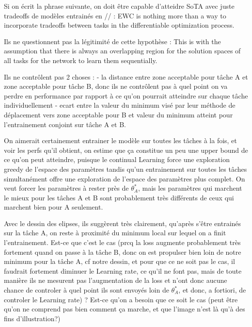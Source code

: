 \documentclass[twocolumn]{article}
\begin{document}
\vspace{1mm}
\noindent
Si on écrit la phrase suivante, on doit être capable d'atteidre SoTA avec juste tradeoffs de modèles entrainés en // : EWC is nothing more than a way to incorporate tradeoffs between tasks in the differentiable optimization process.

\vspace{1mm}
\noindent
Ils ne questionnent pas la légitimité de cette hypothèse :  This is with the assumption that there is always
an overlapping region for the solution spaces of all tasks for the network to learn them sequentially.

\vspace{1mm}
\noindent
Ils ne contrôlent pas 2 choses :
- la distance entre zone acceptable pour tâche A et zone acceptable pour tâche B, donc ils ne contrôlent pas à quel point on va perdre en performance par rapport à ce qu'on pourrait atteindre sur chaque tâche individuellement
- ecart entre la valeur du minimum visé par leur méthode de déplacement vers zone acceptable pour B et valeur du minimum atteint pour l'entrainement conjoint sur tâche A et B.

\vspace{1mm}
\noindent
On aimerait certainement entrainer le modèle sur toutes les tâches à la fois, et voir les perfs qu'il obtient, on estime que ça constitue un peu une upper bound de ce qu'on peut atteindre, puisque le continual Learning force une exploration greedy de l'espace des paramètres tandis qu'un entrainement sur toutes les tâches simultanément offre une exploration de l'espace des paramètres plus complet. On veut forcer les paramètres à rester près de $\theta_A^*$, mais les paramètres qui marchent le mieux pour les tâches A et B sont probablement très différents de ceux qui marchent bien pour A seulement.

\vspace{1mm}
\noindent
Avec le dessin des elipses, ils suggèrent très clairement, qu'après s'être entrainés sur la tâche A, on reste à proximité du minimum local sur lequel on a finit l'entrainement. Est-ce que c'est le cas (prcq la loss augmente probablement très fortement quand on passe à la tâche B, donc on est propulser bien loin de notre minimum pour la tâche A, cf notre dessin, et pour que ce ne soit pas le cas, il faudrait fortement diminuer le Learning rate, ce qu'il ne font pas, mais de toute manière ils ne mesurent pas l'augmentation de la loss et n'ont donc aucune chance de controler à quel point ils sont envoyés loin de $\theta_A^*$, et donc, a fortiori, de controler le Learning rate) ? Est-ce qu'on a besoin que ce soit le cas (peut être qu'on ne comprend pas bien comment ça marche, et que l'image n'est là qu'à des fins d'illustration?)
\end{document}
